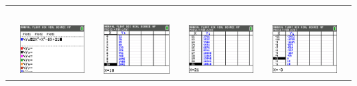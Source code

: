 \documentclass{ximera}
\begin{document}
\begin{voorbeeld}
{\setscreens
\begin{tabularx}{\linewidth}{LGsGsGsGR}
&  && \,\,\GRM{\veetext} && \GRM{\veetext} && \GRM{\wedgetext}\\[0.2cm]
&
{\includegraphics[width=\widthscreens]{screen01}}
&&
{\includegraphics[width=\widthscreens]{screen02}}
&&
{\includegraphics[width=\widthscreens]{screen03}}
&&
{\includegraphics[width=\widthscreens]{screen04}}
&
\end{tabularx}
\setlength{\tabcolsep}{6pt}
}
\end{voorbeeld}
\end{document}
